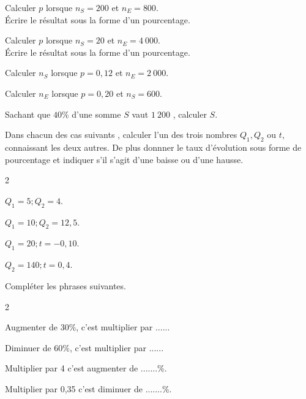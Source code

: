 \documentclass[11pt,a4paper]{article}  %
\begin{document}
\begin{enumMet}
	\item Calculer $p$ lorsque $n_S = 200$ et $n_E = 800$.\\
	Écrire le résultat sous la forme d'un pourcentage.
	\item {} Calculer $p$ lorsque $n_S = 20$ et $n_E= 4\ 000$.\\
	Écrire le résultat sous la forme d'un pourcentage.
	\item Calculer $n_S$ lorsque $p = 0,12$ et $n_E= 2\ 000$.
	\item Calculer $n_E$ lorsque $p = 0,20$ et $n_S = 600$.
	\item Sachant que $40 \%$ d'une somme $S$ vaut $1\ 200$ \EUR{}, calculer $S$.
\end{enumMet}

Dans chacun des cas suivants , calculer l'un des trois nombres $Q_{1}, Q_{2}$ ou $t$, connaissant les deux autres. De plus donnner le taux d'évolution sous forme de pourcentage et indiquer s'il s'agit d'une baisse ou d'une hausse.
	\begin{multicols}{2}
		\begin{enumMet}
		\item {} $Q_{1}=5 ; Q_{2}=4$.
		\item $Q_{1}=10 ; Q_{2}=12,5$.
		\item $Q_{1}=20 ; t=-0,10$.
		\item $Q_{2}=140 ; t=0,4$.
	\end{enumMet}
	\end{multicols}


Compléter les phrases suivantes.
\begin{multicols}{2}
	\begin{enumMet}
	\item Augmenter de $30 \%$, c'est multiplier par ......
	\item Diminuer de $60 \%$, c'est multiplier par ......
	\item Multiplier par 4 c'est augmenter de .......\%.
	\item Multiplier par 0,35 c'est diminuer de .......\%.	
\end{enumMet}
\end{multicols}
\end{document}
